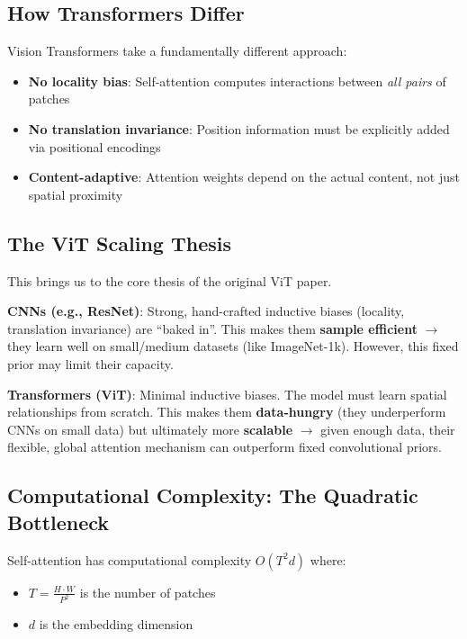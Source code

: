 \documentclass{article}
\begin{document}
\subsection{How Transformers Differ}

Vision Transformers take a fundamentally different approach:

\begin{itemize}
\item \textbf{No locality bias}: Self-attention computes interactions between \textit{all pairs} of patches
\item \textbf{No translation invariance}: Position information must be explicitly added via positional encodings
\item \textbf{Content-adaptive}: Attention weights depend on the actual content, not just spatial proximity
\end{itemize}

\subsection{The ViT Scaling Thesis}

This brings us to the core thesis of the original ViT paper.

\begin{tcolorbox}[colback=yellow!5!white, colframe=orange!50!black, title=Key Insight: Inductive Bias vs. Data]
\textbf{CNNs (e.g., ResNet)}: Strong, hand-crafted inductive biases (locality, translation invariance) are ``baked in''. This makes them \textbf{sample efficient} $\rightarrow$ they learn well on small/medium datasets (like ImageNet-1k). However, this fixed prior may limit their capacity.

\textbf{Transformers (ViT)}: Minimal inductive biases. The model must learn spatial relationships from scratch. This makes them \textbf{data-hungry} (they underperform CNNs on small data) but ultimately more \textbf{scalable} $\rightarrow$ given enough data, their flexible, global attention mechanism can outperform fixed convolutional priors.
\end{tcolorbox}

\subsection{Computational Complexity: The Quadratic Bottleneck}

Self-attention has computational complexity $O(T^2 d)$ where:
\begin{itemize}
\item $T = \frac{H \cdot W}{P^2}$ is the number of patches
\item $d$ is the embedding dimension
\end{itemize}
\end{document}
